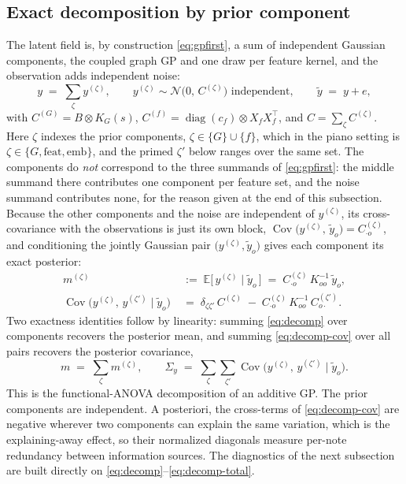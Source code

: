 \documentclass[11pt,a4paper]{report}
\newcommand{\N}{\mathcal{N}}
\newcommand{\Sy}{\Sigma_y}             %
\begin{document}
\subsection{Exact decomposition by prior component}
The latent field is, by construction \eqref{eq:gpfirst}, a sum of
independent Gaussian components, the coupled graph GP and one draw per
feature kernel, and the observation adds independent noise:
\begin{equation}
  y \;=\; \sum_{\zeta} y^{(\zeta)}, \qquad
  y^{(\zeta)} \sim \N\bigl(0,\, C^{(\zeta)}\bigr) \text{ independent}, \qquad
  \tilde y \;=\; y + e,
  \label{eq:components}
\end{equation}
with $C^{(G)} = B \otimes K_G(s)$, $C^{(f)} = \operatorname{diag}(c_f)
\otimes X_f X_f^{\top}$, and $C = \sum_\zeta C^{(\zeta)}$. Here $\zeta$ indexes the
prior components, $\zeta \in \{G\} \cup \{f\}$, which in the piano setting
is $\zeta \in \{G, \mathrm{feat}, \mathrm{emb}\}$, and the primed $\zeta'$
below ranges over the same set. The components do \emph{not} correspond to
the three summands of \eqref{eq:gpfirst}: the middle summand there
contributes one component per feature set, and the noise summand contributes
none, for the reason given at the end of this subsection. Because the other
components and the noise are independent of $y^{(\zeta)}$, its
cross-covariance with the observations is just its own block,
$\operatorname{Cov}\bigl(y^{(\zeta)},\, \tilde y_o\bigr) = C^{(\zeta)}_{\cdot o}$,
and conditioning the jointly Gaussian pair $\bigl(y^{(\zeta)}, \tilde y_o\bigr)$
gives each component its exact posterior:
\begin{align}
  m^{(\zeta)} \;&:=\; \mathbb{E}\bigl[\, y^{(\zeta)} \mid \tilde y_o \,\bigr]
  \;=\; C^{(\zeta)}_{\cdot o}\, K_{oo}^{-1}\, \tilde y_o,
  \label{eq:decomp}\\[2pt]
  \operatorname{Cov}\bigl(y^{(\zeta)},\, y^{(\zeta')} \mid \tilde y_o\bigr)
  \;&=\; \delta_{\zeta\zeta'}\, C^{(\zeta)}
  \;-\; C^{(\zeta)}_{\cdot o}\, K_{oo}^{-1}\, C^{(\zeta')}_{o \cdot}.
  \label{eq:decomp-cov}
\end{align}
Two exactness identities follow by linearity: summing \eqref{eq:decomp} over components recovers the posterior mean,
and summing \eqref{eq:decomp-cov} over all pairs recovers the posterior
covariance,
\begin{equation}
  m \;=\; \sum_\zeta m^{(\zeta)}, \qquad
  \Sy \;=\; \sum_{\zeta}\sum_{\zeta'}
  \operatorname{Cov}\bigl(y^{(\zeta)},\, y^{(\zeta')} \mid \tilde y_o\bigr).
  \label{eq:decomp-total}
\end{equation}
This is the functional-ANOVA decomposition of an additive GP. The prior
components are independent. A posteriori, the cross-terms of
\eqref{eq:decomp-cov} are negative wherever two components can explain the
same variation, which is the explaining-away effect, so their normalized
diagonals measure per-note redundancy between information sources. The
diagnostics of the next subsection are built directly on
\eqref{eq:decomp}--\eqref{eq:decomp-total}.
\end{document}
